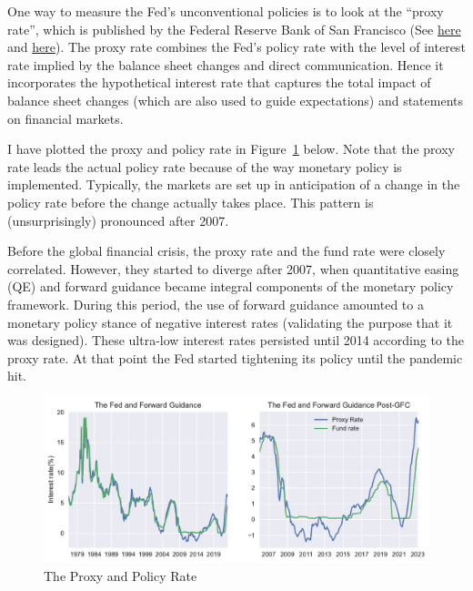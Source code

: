 \documentclass[
  letterpaper,
  DIV=11,
  numbers=noendperiod]{scrartcl}
\begin{document}
One way to measure the Fed's unconventional policies is to look at the
``proxy rate'', which is published by the Federal Reserve Bank of San
Francisco (See
\href{https://www.frbsf.org/economic-research/indicators-data/proxy-funds-rate/}{here}
and
\href{https://www.frbsf.org/economic-research/publications/economic-letter/2022/november/monetary-policy-stance-is-tighter-than-federal-funds-rate/}{here}).
The proxy rate combines the Fed's policy rate with the level of interest
rate implied by the balance sheet changes and direct communication.
Hence it incorporates the hypothetical interest rate that captures the
total impact of balance sheet changes (which are also used to guide
expectations) and statements on financial markets.

I have plotted the proxy and policy rate in Figure~\ref{fig-1} below.
Note that the proxy rate leads the actual policy rate because of the way
monetary policy is implemented. Typically, the markets are set up in
anticipation of a change in the policy rate before the change actually
takes place. This pattern is (unsurprisingly) pronounced after 2007.

Before the global financial crisis, the proxy rate and the fund rate
were closely correlated. However, they started to diverge after 2007,
when quantitative easing (QE) and forward guidance became integral
components of the monetary policy framework. During this period, the use
of forward guidance amounted to a monetary policy stance of negative
interest rates (validating the purpose that it was designed). These
ultra-low interest rates persisted until 2014 according to the proxy
rate. At that point the Fed started tightening its policy until the
pandemic hit.

\begin{figure}

{\centering \includegraphics{Hawkish_Fed_files/figure-pdf/fig-1-output-1.pdf}

}

\caption{\label{fig-1}The Proxy and Policy Rate}

\end{figure}
\end{document}
